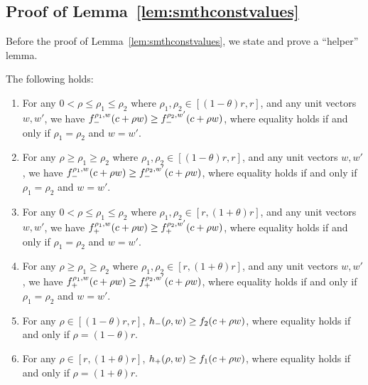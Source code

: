 \subsection{Proof of Lemma~\ref{lem:smthconstvalues}}
\label{sec:proof-smthconstvalues}
Before the proof of Lemma~\ref{lem:smthconstvalues}, we state and prove a ``helper'' lemma.
\begin{lemma}
	\label{sublem:smthconstvalues}
	The following holds:
	\begin{enumerate}
		\item \label{itemsub:smthconstvalues-1} For any $0 < \rho \leq \rho_1 \leq \rho_2$ where $\rho_1, \rho_2 \in [(1-\theta)r, r]$, 
		and any unit vectors $w, w'$, we have 
			$f_-^{{\rho_1},{w}}(c+\rho w) \geq f_-^{{\rho_2},{w'}}(c+\rho w)$, 
		where equality holds if and only if $\rho_1 = \rho_2$ and $w = w'$.
		\item \label{itemsub:smthconstvalues-2} For any $\rho \geq \rho_1 \geq \rho_2$ where $\rho_1, \rho_2 \in [(1-\theta)r, r]$, 
		and any unit vectors $w, w'$, we have 
			$f_-^{{\rho_1},{w}}(c+\rho w) \geq f_-^{{\rho_2},{w'}}(c+\rho w)$, 
		where equality holds if and only if $\rho_1 = \rho_2$ and $w = w'$.
		\item \label{itemsub:smthconstvalues-3} For any $0 < \rho \leq \rho_1 \leq \rho_2$ where $\rho_1, \rho_2 \in [r, (1+\theta)r]$, 
		and any unit vectors $w, w'$, we have
			$f_+^{{\rho_1},{w}}(c+\rho w) \geq f_+^{{\rho_2},{w'}}(c+\rho w)$, 
		where equality holds if and only if $\rho_1 = \rho_2$ and $w = w'$.
		\item \label{itemsub:smthconstvalues-4} For any $\rho \geq \rho_1 \geq \rho_2$ where $\rho_1, \rho_2 \in [r, (1+\theta)r]$, 
		and any unit vectors $w, w'$, we have
			$f_+^{{\rho_1},{w}}(c+\rho w) \geq f_+^{{\rho_2},{w'}}(c+\rho w)$, 
		where equality holds if and only if $\rho_1 = \rho_2$ and $w = w'$.
		\item \label{itemsub:smthconstvalues-5} For any $\rho \in [(1-\theta)r,r]$,
			$h_-(\rho,w) \geq f_{2}(c+\rho w)$,
		where equality holds if and only if $\rho = (1-\theta)r$.
		\item \label{itemsub:smthconstvalues-6} For any $\rho \in [r,(1+\theta)r]$,
			$h_+(\rho,w) \geq f_{1}(c+\rho w)$,
		where equality holds if and only if $\rho = (1+\theta)r$.
	\end{enumerate}
\end{lemma}
